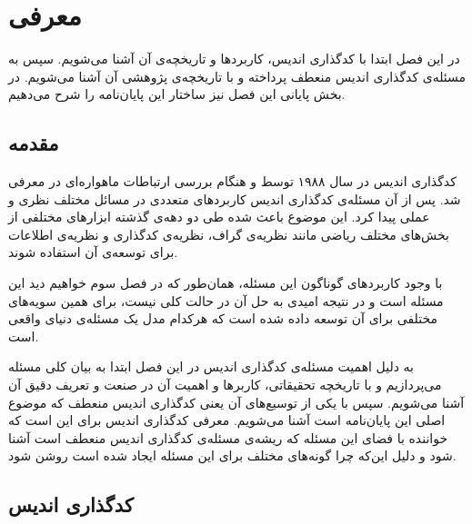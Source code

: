 \chapter{معرفی}
\label{chapter:introduction}

 در این فصل ابتدا با کدگذاری اندیس، کاربردها و تاریخچه‌ی آن آشنا می‌شویم. سپس به مسئله‌ی کدگذاری اندیس منعطف پرداخته و با تاریخچه‌ی پژوهشی آن آشنا می‌شویم. در بخش پایانی این فصل نیز ساختار این پایان‌نامه را شرح می‌دهیم.
\pagebreak

\section{مقدمه}
کدگذاری اندیس در سال ۱۹۸۸ توسط 
و
هنگام بررسی ارتباطات ماهواره‌ای در
\cite{25}
معرفی شد. پس از آن مسئله‌ی کدگذاری اندیس کاربردهای متعددی در مسائل مختلف نظری و عملی پیدا کرد. این موضوع باعث شده طی دو دهه‌ی گذشته ابزارهای مختلفی از بخش‌های مختلف ریاضی مانند نظریه‌ی گراف، نظریه‌ی کدگذاری و نظریه‌ی اطلاعات برای توسعه‌ی آن استفاده شوند.

	با وجود کاربردهای گوناگون این مسئله، همان‌طور که در فصل سوم خواهیم دید این مسئله
است و در نتیجه امیدی به حل آن در حالت کلی نیست، برای همین سویه‌های مختلفی برای آن توسعه داده شده است که هرکدام مدل یک مسئله‌ی دنیای واقعی است.

به دلیل اهمیت مسئله‌ی کدگذاری اندیس در این فصل ابتدا به بیان کلی مسئله می‌پردازیم و با تاریخچه تحقیقاتی، کاربرها و اهمیت آن در صنعت و تعریف دقیق آن آشنا می‌شویم. سپس با یکی از توسیع‌های آن یعنی کدگذاری اندیس منعطف که موضوع اصلی این پایان‌نامه است آشنا می‌شویم. معرفی کدگذاری اندیس برای این است که خواننده با فضای این مسئله‌ که ریشه‌ی مسئله‌ی کدگذاری اندیس منعطف است آشنا شود و دلیل این‌که چرا گونه‌های مختلف برای این مسئله ایجاد شده است روشن شود.
\pagebreak
\section{کدگذاری اندیس}

